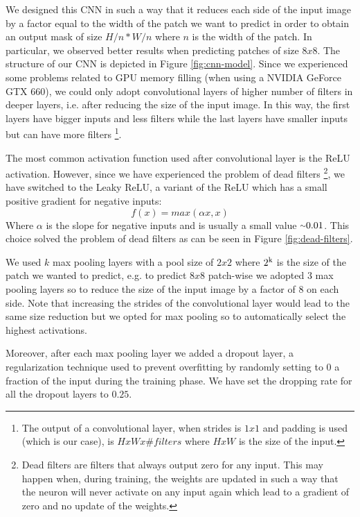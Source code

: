 \documentclass[10pt,conference,compsocconf]{IEEEtran}
\begin{document}
We designed this CNN in such a way that it reduces each side of the input image by a factor equal to the width of the patch we want to predict in order to obtain an output mask of size $H/n*W/n$ where $n$ is the width of the patch. In particular, we observed better results when predicting patches of size $8x8$. The structure of our CNN is depicted in Figure \ref{fig:cnn-model}. Since we experienced some problems related to GPU memory filling (when using a NVIDIA GeForce GTX 660), we could only adopt convolutional layers of higher number of filters in deeper layers, i.e. after reducing the size of the input image. In this way, the first layers have bigger inputs and less filters while the last layers have smaller inputs but can have more filters \footnote{The output of a convolutional layer, when strides is $1x1$ and padding is used (which is our case), is $H x W x \#filters$ where $HxW$ is the size of the input.}.

The most common activation function used after convolutional layer is the ReLU activation. However, since we have experienced the problem of dead filters \footnote{Dead filters are filters that always output zero for any input. This may happen when, during training, the weights are updated in such a way that the neuron will never activate on any input again which lead to a gradient of zero and no update of the weights.}, we have switched to the Leaky ReLU, a variant of the ReLU which has a small positive gradient for negative inputs:
$$f(x)=max(\alpha x, x)$$
Where $\alpha$ is the slope for negative inputs and is usually a small value ${\raise.17ex\hbox{$\scriptstyle\sim$}}0.01$.
This choice solved the problem of dead filters as can be seen in Figure \ref{fig:dead-filters}.

We used $k$ max pooling layers with a pool size of $2x2$ where $2\textsuperscript{k}$ is the size of the patch we wanted to predict, e.g. to predict $8x8$ patch-wise we adopted 3 max pooling layers so to reduce the size of the input image by a factor of 8 on each side. Note that increasing the strides of the convolutional layer would lead to the same size reduction but we opted for max pooling so to automatically select the highest activations.

Moreover, after each max pooling layer we added a dropout layer, a regularization technique used to prevent overfitting by randomly setting to 0 a fraction of the input during the training phase. We have set the dropping rate for all the dropout layers to $0.25$.
\end{document}
